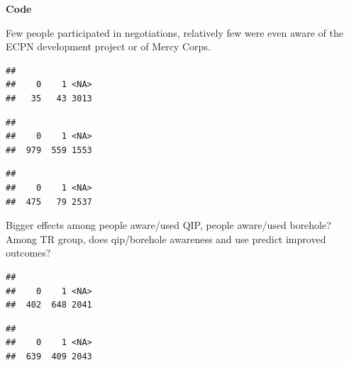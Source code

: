 \documentclass[
]{article}
\newenvironment{Shaded}{\begin{snugshade}}{\end{snugshade}}
\newcommand{\AttributeTok}[1]{\textcolor[rgb]{0.77,0.63,0.00}{#1}}
\newcommand{\DocumentationTok}[1]{\textcolor[rgb]{0.56,0.35,0.01}{\textbf{\textit{#1}}}}
\newcommand{\FunctionTok}[1]{\textcolor[rgb]{0.00,0.00,0.00}{#1}}
\newcommand{\NormalTok}[1]{#1}
\newcommand{\SpecialCharTok}[1]{\textcolor[rgb]{0.00,0.00,0.00}{#1}}
\begin{document}
\textbf{Code}

Few people participated in negotiations, relatively few were even aware
of the ECPN development project or of Mercy Corps.

\begin{Shaded}
\end{Shaded}

\begin{verbatim}
## 
##    0    1 <NA> 
##   35   43 3013
\end{verbatim}

\begin{Shaded}
\end{Shaded}

\begin{verbatim}
## 
##    0    1 <NA> 
##  979  559 1553
\end{verbatim}

\begin{Shaded}
\end{Shaded}

\begin{verbatim}
## 
##    0    1 <NA> 
##  475   79 2537
\end{verbatim}

Bigger effects among people aware/used QIP, people aware/used borehole?
Among TR group, does qip/borehole awareness and use predict improved
outcomes?

\begin{verbatim}
## 
##    0    1 <NA> 
##  402  648 2041
\end{verbatim}

\begin{verbatim}
## 
##    0    1 <NA> 
##  639  409 2043
\end{verbatim}
\end{document}
